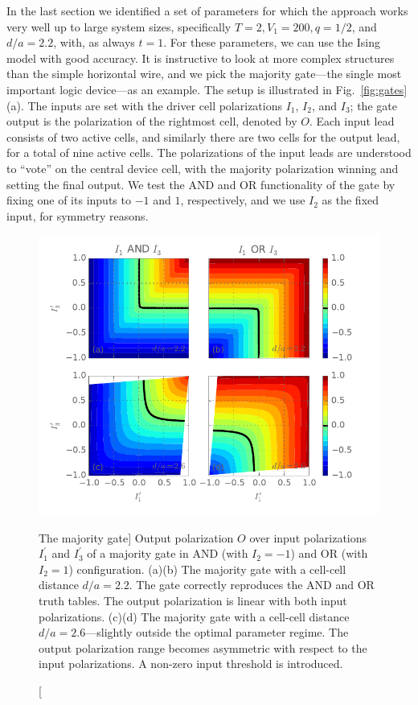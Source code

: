 In the last section we identified a set of parameters for which the 
approach works very well up to large system sizes, specifically $T = 2, V_1 =
200, q = 1/2$, and $d/a = 2.2$, with, as always $t = 1$. For these parameters,
we can use the Ising model with good accuracy. It is instructive to look at more
complex  structures than the simple horizontal wire, and we pick the
majority gate---the single most important  logic device---as an
example. The setup is illustrated in Fig.~\ref{fig:gates}(a). The inputs are set
with the driver cell polarizations $I_1$, $I_2$, and $I_3$; the gate output is
the polarization of the rightmost cell, denoted by $O$. Each input lead consists
of two active cells, and similarly there are two cells for the output lead, for
a total of nine active cells. The polarizations of the input leads are
understood to ``vote'' on the central device cell, with the majority
polarization winning and setting the final output. We test the AND and OR
functionality of the gate by fixing one of its inputs to $-1$ and $1$,
respectively, and we use $I_2$ as the fixed input, for symmetry reasons.

\begin{figure}
  \center
  \includegraphics{majority_gate_contour}
  \caption
  [The majority gate]
  {
  Output polarization $O$ over input polarizations $I_1^{\prime}$ and
  $I_3^{\prime}$ of a majority gate in AND (with $I_2 = -1$) and OR (with $I_2 =
  1$) configuration. (a)(b) The majority gate with a cell-cell distance $d/a =
  2.2$. The gate correctly reproduces the AND and OR truth tables. The output
  polarization is linear with both input polarizations. (c)(d) The majority gate with
  a cell-cell distance $d/a = 2.6$---slightly outside the optimal parameter
  regime. The output polarization range becomes asymmetric with respect to the
  input polarizations. A non-zero input threshold is introduced.
  }
  \label{fig:majority_gate_contour}
\end{figure}

